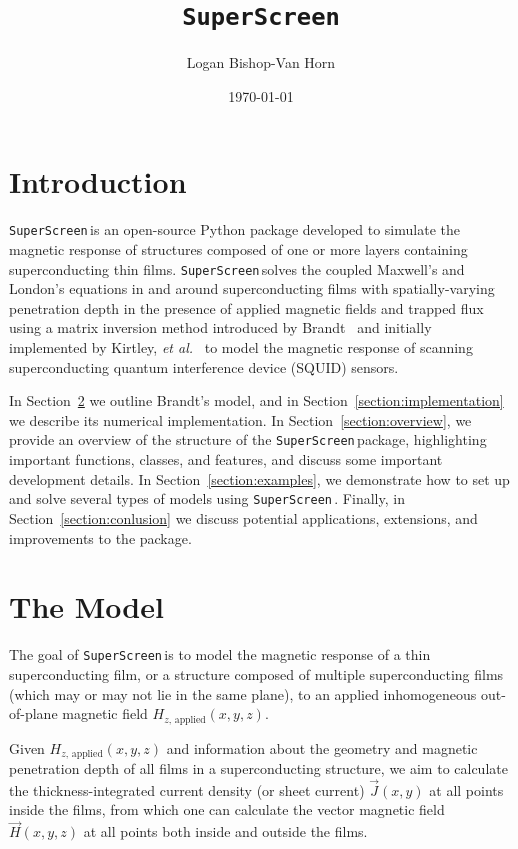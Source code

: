 \documentclass{article}
\title{\texttt{SuperScreen}}
\author{Logan Bishop-Van Horn}
\date{\today}
\newcommand{\SuperScreen}{\texttt{SuperScreen}\,}
\begin{document}
\maketitle

\section{Introduction}
\label{section:introduction}

\SuperScreen is an open-source Python package developed to simulate the magnetic response of structures composed of one or more layers containing superconducting thin films. \SuperScreen solves the coupled Maxwell's and London's equations in and around superconducting films with spatially-varying penetration depth in the presence of applied magnetic fields and trapped flux using a matrix inversion method introduced by Brandt~\cite{brandt_thin_2005} and initially implemented by Kirtley, \emph{et al.}~\cite{kirtley_scanning_2016, kirtley_response_2016} to model the magnetic response of scanning superconducting quantum interference device (SQUID) sensors.

In Section~\ref{section:model} we outline Brandt's model, and in Section~\ref{section:implementation} we describe its numerical implementation. In Section~\ref{section:overview}, we provide an overview of the structure of the \SuperScreen package, highlighting important functions, classes, and features, and discuss some important development details. In Section~\ref{section:examples}, we demonstrate how to set up and solve several types of models using \SuperScreen. Finally, in Section~\ref{section:conlusion} we discuss potential applications, extensions, and improvements to the package.

\section{The Model}
\label{section:model}

The goal of \SuperScreen is to model the magnetic response of a thin superconducting film, or a structure composed of multiple superconducting films (which may or may not lie in the same plane), to an applied inhomogeneous out-of-plane magnetic field
$H_{z,\,\mathrm{applied}}(x, y, z)$.

Given $H_{z,\,\mathrm{applied}}(x, y, z)$ and information about the geometry and magnetic penetration depth of all films in a superconducting structure, we aim to calculate the thickness-integrated current density (or sheet current) $\vec{J}(x, y)$ at all points inside the films, from which one can calculate the vector magnetic field $\vec{H}(x, y, z)$ at all points both inside and outside the films.
\end{document}
